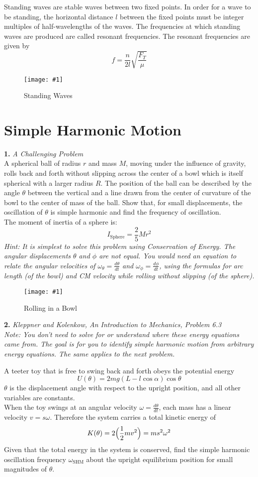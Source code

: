 \documentclass[11pt]{article}
\newcommand{\fig}[4]{
    \begin{figure}[H]
        \centering
        \texttt{[image: \#1]}
        \caption{#2}
        \label{exp4fit}
    \end{figure}
}
\theoremstyle{gangnamstyle}{\newtheorem{definition}{Definition}[]}
\theoremstyle{gangnamstyle}{\newtheorem{example}{Example}[]}
\theoremstyle{gangnamstyle}{\newtheorem{problem}{Problem}[]}
\begin{document}
Standing waves are stable waves between two fixed points. In order for a wave to be standing, the horizontal distance $l$ between the fixed points must be integer multiples of half-wavelengths of the waves. The frequencies at which standing waves are produced are called resonant frequencies. The resonant frequencies are given by
\[ f = \frac{n}{2l}\sqrt{\frac{F_T}{\mu}} \]

\fig{figs/0730/stand.png}{Standing Waves}{0.55}{0}

\pagebreak

\section{Simple Harmonic Motion}

\textbf{1.} \textit{A Challenging Problem} \\
A spherical ball of radius $r$ and mass $M$, moving under the influence of gravity, rolls back and forth without slipping across the center of a bowl which is itself spherical with a larger radius $R$. The position of the ball can be described by the angle $\theta$ between the vertical and a line drawn from the center of curvature of the bowl to the center of mass of the ball. Show that, for small displacements, the oscillation of $\theta$ is simple harmonic and find the frequency of oscillation. \\
The moment of inertia of a sphere is: 
\[ I_{\text{Sphere}} = \frac{2}{5}Mr^2 \]
\textit{Hint: It is simplest to solve this problem using Conservation of Energy. The angular displacements $\theta$ and $\phi$ are not equal. You would need an equation to relate the angular velocities of $\omega_\theta = \frac{d\theta}{dt}$ and $\omega_\phi = \frac{d\phi}{dt}$, using the formulas for arc length (of the bowl) and CM velocity while rolling without slipping (of the sphere).}
\fig{figs/0729/charman.png}{Rolling in a Bowl}{0.75}{0}

\pagebreak

\textbf{2.} \textit{Kleppner and Kolenkow, An Introduction to Mechanics, Problem 6.3} \\
\textit{Note: You don't need to solve for or understand where these energy equations came from. The goal is for you to identify simple harmonic motion from arbitrary energy equations. The same applies to the next problem. }

A teeter toy that is free to swing back and forth obeys the potential energy
\[ U(\theta) = 2mg(L - l\cos\alpha)\cos\theta \]
$\theta$ is the displacement angle with respect to the upright position, and all other variables are constants. \\
When the toy swings at an angular velocity $\omega = \frac{d\theta}{dt}$, each mass has a linear velocity $v = s\omega$. Therefore the system carries a total kinetic energy of 
\[ K(\theta) = 2\Bigl(\frac{1}{2}mv^2\Bigr) = ms^2\omega^2 \]
Given that the total energy in the system is conserved, find the simple harmonic oscillation frequency $\omega_{\text{SHM}}$ about the upright equilibrium position for small magnitudes of $\theta$. 
\end{document}
